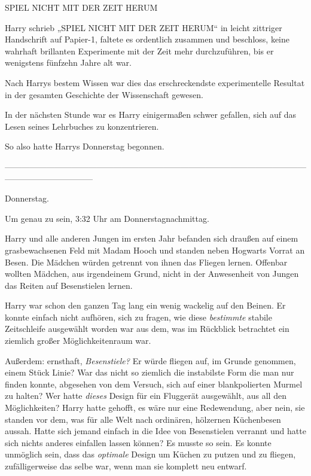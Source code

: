 {SPIEL NICHT MIT DER ZEIT HERUM

Harry schrieb „SPIEL NICHT MIT DER ZEIT HERUM“ in leicht zittriger Handschrift auf Papier-1, faltete es ordentlich zusammen und beschloss, keine wahrhaft brillanten Experimente mit der Zeit mehr durchzuführen, bis er wenigstens fünfzehn Jahre alt war.

Nach Harrys bestem Wissen war dies das erschreckendste experimentelle Resultat in der gesamten Geschichte der Wissenschaft gewesen.

In der nächsten Stunde war es Harry einigermaßen schwer gefallen, sich auf das Lesen seines Lehrbuches zu konzentrieren.

So also hatte Harrys Donnerstag begonnen.

--------------------------------------------------------------------------------------------------------------------------------------------

\hfill\break Donnerstag.

Um genau zu sein, 3:32 Uhr am Donnerstagnachmittag.

Harry und alle anderen Jungen im ersten Jahr befanden sich draußen auf einem grasbewachsenen Feld mit Madam Hooch und standen neben Hogwarts Vorrat an Besen. Die Mädchen würden getrennt von ihnen das Fliegen lernen. Offenbar wollten Mädchen, aus irgendeinem Grund, nicht in der Anwesenheit von Jungen das Reiten auf Besenstielen lernen.

Harry war schon den ganzen Tag lang ein wenig wackelig auf den Beinen. Er konnte einfach nicht aufhören, sich zu fragen, wie diese \emph{bestimmte} stabile Zeitschleife ausgewählt worden war aus dem, was im Rückblick betrachtet ein ziemlich großer Möglichkeitenraum war.

Außerdem: ernsthaft, \emph{Besenstiele?} Er würde fliegen auf, im Grunde genommen, einem Stück Linie? War das nicht so ziemlich die instabilste Form die man nur finden konnte, abgesehen von dem Versuch, sich auf einer blankpolierten Murmel zu halten? Wer hatte \emph{dieses} Design für ein Fluggerät ausgewählt, aus all den Möglichkeiten? Harry hatte gehofft, es wäre nur eine Redewendung, aber nein, sie standen vor dem, was für alle Welt nach ordinären, hölzernen Küchenbesen aussah. Hatte sich jemand einfach in die Idee von Besenstielen verrannt und hatte sich nichts anderes einfallen lassen können? Es musste so sein. Es konnte unmöglich sein, dass das \emph{optimale} Design um Küchen zu putzen und zu fliegen, zufälligerweise das selbe war, wenn man sie komplett neu entwarf.

}
